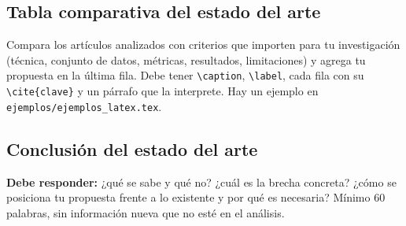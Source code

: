 \subsection{Tabla comparativa del estado del arte} \label{sec:tabla_estado_arte} %

\begin{guia}
Compara los artículos analizados con criterios que importen para tu investigación (técnica, conjunto de datos,
métricas, resultados, limitaciones) y agrega tu propuesta en la última fila. Debe tener \verb|\caption|, \verb|\label|,
cada fila con su \verb|\cite{clave}| y un párrafo que la interprete. Hay un ejemplo en \texttt{ejemplos/ejemplos\_latex.tex}.
\end{guia}

\subsection{Conclusión del estado del arte} \label{sec:conclusion_estado_arte} %

\begin{guia}
\textbf{Debe responder:} ¿qué se sabe y qué no? ¿cuál es la brecha concreta? ¿cómo se posiciona tu propuesta frente a lo
existente y por qué es necesaria? Mínimo 60 palabras, sin información nueva que no esté en el análisis.
\end{guia}

